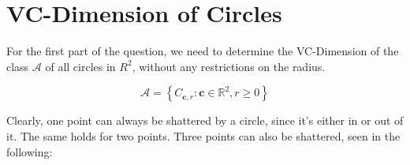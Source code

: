 \documentclass[a4paper, 11pt]{article} %
\begin{document}
\section*{VC-Dimension of Circles}

For the first part of the question, we need to determine the VC-Dimension of the class $\mathcal{A}$ of all circles in $R^2$, without any restrictions on the radius. 

$$ \mathcal { A } = \left\{ C _ { \boldsymbol { c } , r } : \boldsymbol { c } \in \mathbb { R } ^ { 2 } , r \geq 0 \right\}$$

Clearly, one point can always be shattered by a circle, since it's either in or out of it. The same holds for two points. Three points can also be shattered, seen in the following: \\

\end{document}
